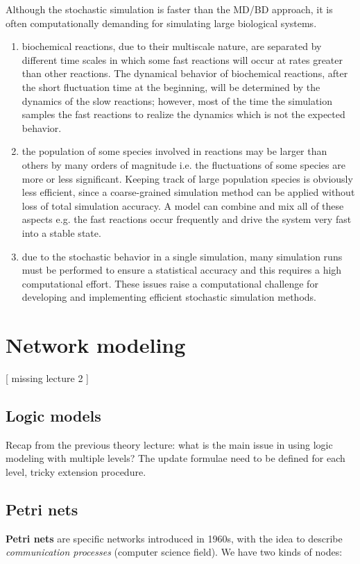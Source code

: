 \noindent
Although the stochastic simulation is faster than the MD/BD approach, it is often computationally demanding for simulating large biological systems.
\begin{enumerate}
\item biochemical reactions, due to their multiscale nature, are separated by different time scales in which some fast reactions will occur at rates greater than other reactions. The dynamical behavior of biochemical reactions, after the short fluctuation time at the beginning, will be determined by the dynamics of the slow reactions; however, most of the time the simulation samples the fast reactions to realize the dynamics which is not the expected behavior.
\item the population of some species involved in reactions may be larger than others by many orders of magnitude i.e.  the fluctuations of some species are more or less significant. Keeping track of large population species is obviously less efficient, since a coarse-grained simulation method can be applied without loss of total simulation accuracy. A model can combine and mix all of these aspects e.g. the fast reactions occur frequently and drive the system very fast into a stable state.
\item due to the stochastic behavior in a single simulation, many simulation runs must be performed to ensure a statistical accuracy and this requires a high computational effort. These issues raise a computational challenge for developing and implementing efficient stochastic simulation methods.
\end{enumerate}

\section{Network modeling}

[ missing lecture 2 ] 

  \subsection{Logic models}
  Recap from the previous theory lecture: what is the main issue in using logic modeling with multiple levels? The update formulae need to be defined for each level, tricky extension procedure.

  \subsection{Petri nets}
  \textbf{Petri nets} are specific networks introduced in 1960s, with the idea to describe \emph{communication processes} (computer science field).
  We have two kinds of nodes:

